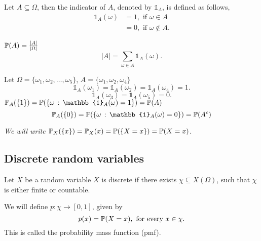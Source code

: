 \documentclass[10pt, a4paper]{article}
\begin{document}
\begin{definition}
    Let $A \subseteq \Omega$,
    then the indicator of $A$,
    denoted by $\mathbb{1}_A$,
    is defined as follows,
    \begin{align*}
    \mathbb{1}_A(\omega) &= 1,\text{ if } \omega \in A \\
    &= 0,\text{ if } \omega \notin A.
    \end{align*}
\end{definition}

$\P(A) = \frac{|A|}{|\Omega|}$
\[
|A| = \sum_{\omega \in A}\mathbb{1}_A(\omega).
\]

\begin{example}
    Let $\Omega = \{\omega_1, \omega_2, \dotsc, \omega_5\}$,
    $A = \{\omega_1, \omega_2, \omega_4\}$
    \[
    \mathbb{1}_A(\omega_1) = \mathbb{1}_A(\omega_2) = \mathbb{1}_A(\omega_4) = 1.
    \]
    \[
    \mathbb{1}_A(\omega_3) = \mathbb{1}_A(\omega_5) = 0.
    \]
    $\P_A(\{1\}) = \P(\{\omega\,:\,\mathbb{1}_A(\omega) = 1\}) = \P(A)$
    \[
    \P_A(\{0\}) = \P(\{\omega\,:\,\mathbb{1}_A(\omega) = 0\}) = \P(A ^ c)
    \]
\end{example}

\textit{We will write $\P_X(\{x\}) = \P_X(x) = \P(\{X = x\}) = \P(X = x)$.}

\subsection{Discrete random variables}
\begin{definition}
    Let $X$ be a random variable $X$ is discrete if there exists $\chi \subseteq X(\Omega)$,
    such that $\chi$ is either finite or countable.

    We will define $p : \chi \rightarrow [0, 1]$,
    given by
    \[
    p(x) = \P(X = x),\text{ for every } x \in \chi.
    \]
    This is called the probability mass function (pmf).
\end{definition}
\end{document}
